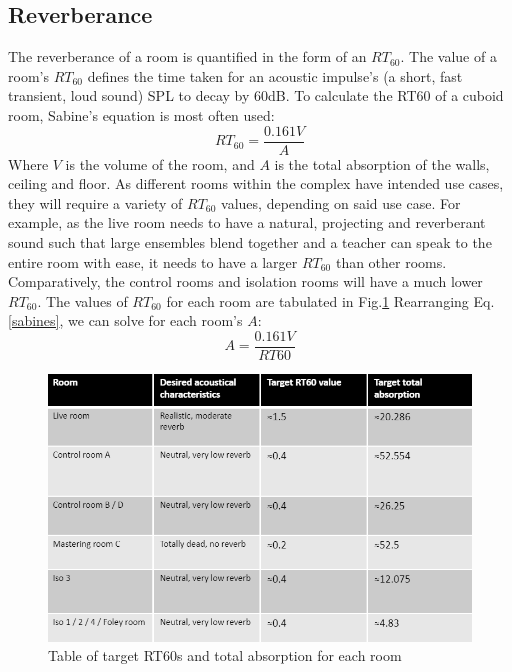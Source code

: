 \documentclass[10pt, twocolumn]{article}
\begin{document}
        \subsection{Reverberance}
            The reverberance of a room is quantified in the form of an $RT_{60}$.
            The value of a room's $RT_{60}$ defines the time taken for an acoustic impulse's (a short, fast transient, loud sound) SPL to decay by 60dB.
            To calculate the RT60 of a cuboid room, Sabine's equation is most often used:
            \begin{equation}\label{sabines}
                RT_{60} = \frac{0.161 V}{A}
            \end{equation}
            Where $V$ is the volume of the room, and $A$ is the total absorption of the walls, ceiling and floor.
            As different rooms within the complex have intended use cases, they will require a variety of $RT_{60}$ values, depending on said use case.
            For example, as the live room needs to have a natural, projecting and reverberant sound such that large ensembles blend together and a teacher can speak to the entire room with ease, it needs to have a larger $RT_{60}$ than other rooms.
            Comparatively, the control rooms and isolation rooms will have a much lower $RT_{60}$.
            The values of $RT_{60}$ for each room are tabulated in Fig.\ref{RT60}
            Rearranging Eq.\ref{sabines}, we can solve for each room's $A$:
            \begin{equation}
                A = \frac{0.161V}{RT60} 
            \end{equation}
            \begin{figure}
                \includegraphics[scale=0.45]{resources/RT60.png}
                \caption{Table of target RT60s and total absorption for each room}
                \label{RT60}
                \centering
            \end{figure}
\end{document}
